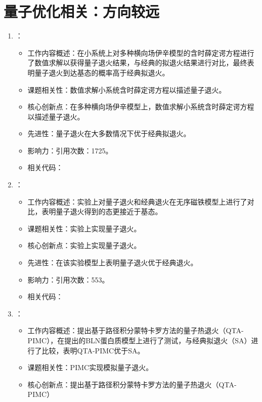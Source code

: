 \section{量子优化相关：方向较远}
\begin{enumerate}
        \item \citet{kadowaki1998quantum}：
            \begin{itemize}
                \item 工作内容概述：在小系统上对多种横向场伊辛模型的含时薛定谔方程进行了数值求解以获得量子退火结果，与经典的拟退火结果进行对比，最终表明量子退火到达基态的概率高于经典拟退火。
                \item 课题相关性：数值求解小系统含时薛定谔方程以描述量子退火。
                \item 核心创新点：在多种横向场伊辛模型上，数值求解小系统含时薛定谔方程以描述量子退火。
                \item 先进性：量子退火在大多数情况下优于经典拟退火。
                \item 影响力：引用次数：1725。
                \item 相关代码：
            \end{itemize}
        \item \citet{brooke1999quantum}：
            \begin{itemize}
                \item 工作内容概述：实验上对量子退火和经典退火在无序磁铁模型上进行了对比，表明量子退火得到的态更接近于基态。
                \item 课题相关性：实验上实现量子退火。
                \item 核心创新点：实验上实现量子退火。
                \item 先进性：在该实验模型上表明量子退火优于经典退火。
                \item 影响力：引用次数：553。
                \item 相关代码：
            \end{itemize}
            \item \citet{lee2000global}：
            \begin{itemize}
                \item 工作内容概述：提出基于路径积分蒙特卡罗方法的量子热退火（QTA-PIMC），在\citet{honeycutt1992nature}提出的BLN蛋白质模型上进行了测试，与经典拟退火（SA）进行了比较，表明QTA-PIMC优于SA。
                \item 课题相关性：PIMC实现模拟量子退火。
                \item 核心创新点：提出基于路径积分蒙特卡罗方法的量子热退火（QTA-PIMC）

\end{itemize}
\end{enumerate}
